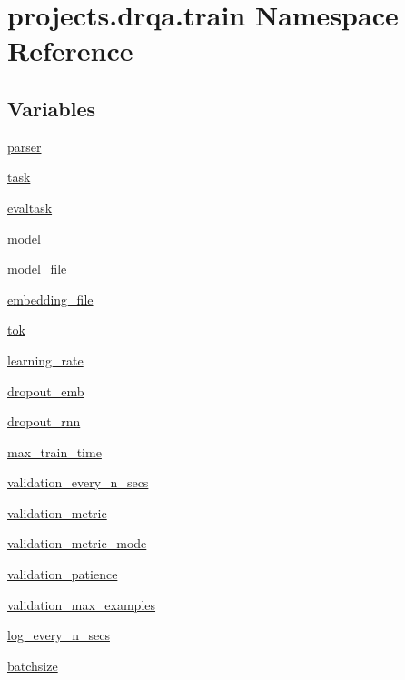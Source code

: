 \hypertarget{namespaceprojects_1_1drqa_1_1train}{}\section{projects.\+drqa.\+train Namespace Reference}
\label{namespaceprojects_1_1drqa_1_1train}
\subsection*{Variables}
\begin{DoxyCompactItemize}
\item 
\hyperlink{namespaceprojects_1_1drqa_1_1train_a2f0306b8f4cc49723a361d3d6fded6ec}{parser}
\item 
\hyperlink{namespaceprojects_1_1drqa_1_1train_a944d6454a737b21088417a75997db128}{task}
\item 
\hyperlink{namespaceprojects_1_1drqa_1_1train_a3488e2b6c4b815dfef8b90e71d019ea6}{evaltask}
\item 
\hyperlink{namespaceprojects_1_1drqa_1_1train_ae72a95e8b2b92c466981a4e4f27679df}{model}
\item 
\hyperlink{namespaceprojects_1_1drqa_1_1train_a11f7657b75bca85e3accda577cf994d9}{model\+\_\+file}
\item 
\hyperlink{namespaceprojects_1_1drqa_1_1train_a82224594b0f57ab62c18eb9eee7e5ab6}{embedding\+\_\+file}
\item 
\hyperlink{namespaceprojects_1_1drqa_1_1train_ae722671b9c00144ddcd9711936a07977}{tok}
\item 
\hyperlink{namespaceprojects_1_1drqa_1_1train_a42c586e15e2020fe388006e91e9fbdff}{learning\+\_\+rate}
\item 
\hyperlink{namespaceprojects_1_1drqa_1_1train_a9164658c897350ad4ed372ff1cef63e5}{dropout\+\_\+emb}
\item 
\hyperlink{namespaceprojects_1_1drqa_1_1train_a5c5d60fd6869c1359539252d24115883}{dropout\+\_\+rnn}
\item 
\hyperlink{namespaceprojects_1_1drqa_1_1train_ae6f2d3306ef14b521025d7fcf02e174f}{max\+\_\+train\+\_\+time}
\item 
\hyperlink{namespaceprojects_1_1drqa_1_1train_a9f41c45c7fe5bc2823d8aa1da350a178}{validation\+\_\+every\+\_\+n\+\_\+secs}
\item 
\hyperlink{namespaceprojects_1_1drqa_1_1train_a4c022d1e0f9e0b5b93df817e5830eb40}{validation\+\_\+metric}
\item 
\hyperlink{namespaceprojects_1_1drqa_1_1train_a991f5e4a1bc037d3a511ad26da1c8261}{validation\+\_\+metric\+\_\+mode}
\item 
\hyperlink{namespaceprojects_1_1drqa_1_1train_ab59023dba084ed0b45c9289632b06e60}{validation\+\_\+patience}
\item 
\hyperlink{namespaceprojects_1_1drqa_1_1train_a933201748734c2100575046a5f8d84ce}{validation\+\_\+max\+\_\+examples}
\item 
\hyperlink{namespaceprojects_1_1drqa_1_1train_a15898c0bd7f3aa8a0150ec46b6382254}{log\+\_\+every\+\_\+n\+\_\+secs}
\item 
\hyperlink{namespaceprojects_1_1drqa_1_1train_a5491a9ea692482469dcc37f207db1f9d}{batchsize}
\end{DoxyCompactItemize}


